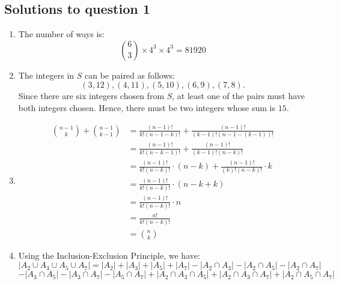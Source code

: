 \documentclass{article}
\begin{document}
\subsection*{Solutions to question 1}

\begin{enumerate}[label=(\alph*)]
    \item The number of ways is:
          \[
              \binom{6}{3} \times 4^3 \times 4^3 = 81920
          \]
    \item The integers in $S$ can be paired as follows:
          \[
              (3, 12), (4, 11), (5, 10), (6, 9), (7, 8).
          \]
          Since there are six integers chosen from $S$, at least one of the pairs must have both integers chosen.
          Hence, there must be two integers whose sum is $15$.
    \item \[
              \begin{aligned}
                  \binom{n-1}{k} + \binom{n-1}{k-1} & = \frac{(n-1)!}{k!(n-1-k)!} + \frac{(n-1)!}{(k-1)!(n-1-(k-1))!}           \\
                                                    & = \frac{(n-1)!}{k!(n-k-1)!} + \frac{(n-1)!}{(k-1)!(n-k)!}                 \\
                                                    & = \frac{(n-1)!}{k!(n-k)!} \cdot (n-k) + \frac{(n-1)!}{(k)!(n-k)!} \cdot k \\
                                                    & = \frac{(n-1)!}{k!(n-k)!} \cdot (n-k+k)                                   \\
                                                    & = \frac{(n-1)!}{k!(n-k)!} \cdot n                                         \\
                                                    & = \frac{n!}{k!(n-k)!}                                                     \\
                                                    & = \binom{n}{k}
              \end{aligned}
          \]
    \item Using the Inclusion-Exclusion Principle, we have:
          \[
              |A_{2} \cup A_{3} \cup A_{5} \cup A_{7}| = |A_{2}| + |A_{3}| + |A_{5}| + |A_{7}| - |A_{2} \cap A_{3}| - |A_{2} \cap A_{5}| - |A_{2} \cap A_{7}|
          \]
          \[
              - |A_{3} \cap A_{5}| - |A_{3} \cap A_{7}| - |A_{5} \cap A_{7}| + |A_{2} \cap A_{3} \cap A_{5}| + |A_{2} \cap A_{3} \cap A_{7}| + |A_{2} \cap A_{5} \cap A_{7}|
          \]

\end{enumerate}
\end{document}
